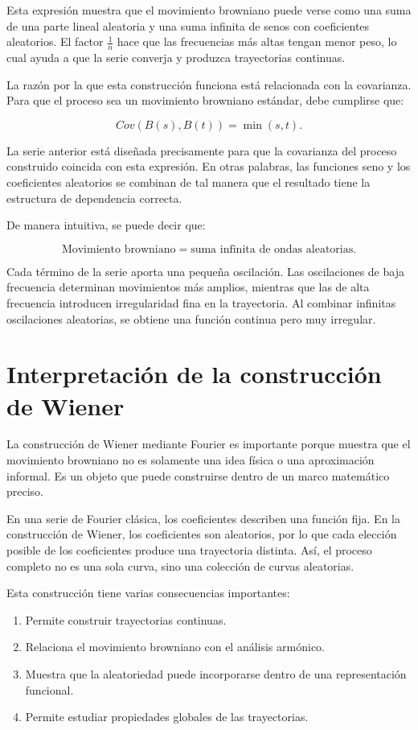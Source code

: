 \documentclass[12pt]{article}
\begin{document}
Esta expresión muestra que el movimiento browniano puede verse como una suma de una parte lineal aleatoria y una suma infinita de senos con coeficientes aleatorios. El factor $\frac{1}{n}$ hace que las frecuencias más altas tengan menor peso, lo cual ayuda a que la serie converja y produzca trayectorias continuas.

La razón por la que esta construcción funciona está relacionada con la covarianza. Para que el proceso sea un movimiento browniano estándar, debe cumplirse que:

\[
Cov(B(s),B(t))=\min(s,t).
\]

La serie anterior está diseñada precisamente para que la covarianza del proceso construido coincida con esta expresión. En otras palabras, las funciones seno y los coeficientes aleatorios se combinan de tal manera que el resultado tiene la estructura de dependencia correcta.

De manera intuitiva, se puede decir que:

\[
\text{Movimiento browniano}
=
\text{suma infinita de ondas aleatorias}.
\]

Cada término de la serie aporta una pequeña oscilación. Las oscilaciones de baja frecuencia determinan movimientos más amplios, mientras que las de alta frecuencia introducen irregularidad fina en la trayectoria. Al combinar infinitas oscilaciones aleatorias, se obtiene una función continua pero muy irregular.

\section{Interpretación de la construcción de Wiener}

La construcción de Wiener mediante Fourier es importante porque muestra que el movimiento browniano no es solamente una idea física o una aproximación informal. Es un objeto que puede construirse dentro de un marco matemático preciso.

En una serie de Fourier clásica, los coeficientes describen una función fija. En la construcción de Wiener, los coeficientes son aleatorios, por lo que cada elección posible de los coeficientes produce una trayectoria distinta. Así, el proceso completo no es una sola curva, sino una colección de curvas aleatorias.

Esta construcción tiene varias consecuencias importantes:

\begin{enumerate}
    \item Permite construir trayectorias continuas.
    \item Relaciona el movimiento browniano con el análisis armónico.
    \item Muestra que la aleatoriedad puede incorporarse dentro de una representación funcional.
    \item Permite estudiar propiedades globales de las trayectorias.
\end{enumerate}
\end{document}
